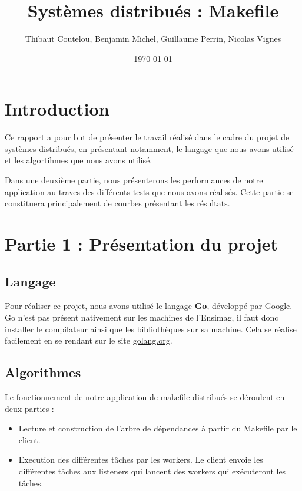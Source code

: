 \documentclass[a4paper,11pt]{article}
\title{Systèmes distribués : Makefile}
\author{Thibaut Coutelou, Benjamin Michel, Guillaume Perrin, Nicolas Vignes}
\date{\today}
\begin{document}
\maketitle

\setlength{\parskip}{2mm}

\section{Introduction}
Ce rapport a pour but de présenter le travail réalisé dans le cadre du projet
de systèmes distribués, en présentant notamment, le langage que nous avons
utilisé et les algortihmes que nous avons utilisé.

Dans une deuxième partie, nous présenterons les performances de notre
application au traves des différents tests que nous avons réalisés. Cette
partie se constituera principalement de courbes présentant les résultats.

\section{Partie 1 : Présentation du projet}
\subsection{Langage}
Pour réaliser ce projet, nous avons utilisé le langage \textbf{Go}, développé
par Google. Go n'est pas présent nativement sur les machines de l'Ensimag, il
faut donc installer le compilateur ainsi que les bibliothèques sur sa machine.
Cela se réalise facilement en se rendant sur le site
\href{http://golang.org/doc/install#download}{golang.org}.

\subsection{Algorithmes}
Le fonctionnement de notre application de makefile distribués se déroulent en deux parties :
\begin{itemize}
\item Lecture et construction de l'arbre de dépendances à partir du Makefile
    par le client.
\item Execution des différentes tâches par les workers. Le client envoie les
    différentes tâches aux listeners qui lancent des workers qui exécuteront
    les tâches.
\end{itemize}
\end{document}
